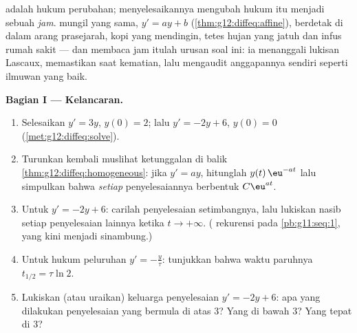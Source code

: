 \begin{problem}
\label{pb:g12:diffeq:1}
 adalah hukum perubahan; menyelesaikannya mengubah
hukum itu menjadi sebuah \emph{jam}.  mungil yang sama,
$y' = ay + b$ (\cref{thm:g12:diffeq:affine}), berdetak di dalam
arang prasejarah, kopi yang mendingin, tetes hujan yang jatuh dan
infus rumah sakit --- dan membaca jam itulah urusan
soal ini: ia menanggali lukisan Lascaux, memastikan saat kematian,
lalu mengaudit anggapannya sendiri seperti ilmuwan yang baik.

\medskip
\noindent\textbf{Bagian I --- Kelancaran.}
\begin{enumerate}
  \item Selesaikan $y' = 3y$, $y(0) = 2$; lalu
        $y' = -2y + 6$, $y(0) = 0$
        (\cref{met:g12:diffeq:solve}).
  \item Turunkan kembali muslihat ketunggalan di balik
        \cref{thm:g12:diffeq:homogeneous}: jika $y' = ay$, hitunglah
         $y(t)\,\eu^{-at}$ lalu simpulkan bahwa
        \emph{setiap} penyelesaiannya berbentuk $C\eu^{at}$.
  \item Untuk $y' = -2y + 6$: carilah penyelesaian setimbangnya, lalu
        lukiskan nasib setiap penyelesaian lainnya ketika
        $t \to +\infty$. ( rekurensi pada
        \cref{pb:g11:seq:1}, yang kini menjadi sinambung.)
  \item Untuk hukum peluruhan $y' = -\frac{y}{\tau}$: tunjukkan bahwa
        waktu paruhnya $t_{1/2} = \tau \ln 2$.
  \item Lukiskan (atau uraikan) keluarga penyelesaian
        $y' = -2y + 6$: apa yang dilakukan penyelesaian yang bermula di atas
        $3$? Yang di bawah $3$? Yang tepat di $3$?
\end{enumerate}


\end{problem}
